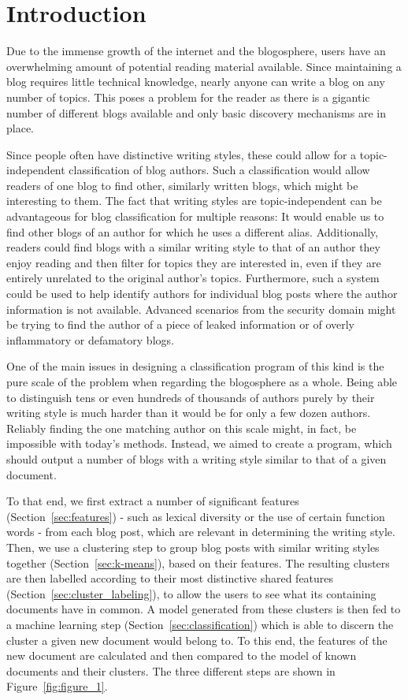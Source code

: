 
\section{Introduction}
\label{sec:introduction}

Due to the immense growth of the internet and the blogosphere, users have an overwhelming amount of potential reading material available.
Since maintaining a blog requires little technical knowledge, nearly anyone can write a blog on any number of topics.
This poses a problem for the reader as there is a gigantic number of different blogs available and only basic discovery mechanisms are in place.


Since people often have distinctive writing styles, these could allow for a topic-independent classification of blog authors.
Such a classification would allow readers of one blog to find other, similarly written blogs, which might be interesting to them.
The fact that writing styles are topic-independent can be advantageous for blog classification for multiple reasons: It would enable us to find other blogs of an author for which he uses a different alias.
Additionally, readers could find blogs with a similar writing style to that of an author they enjoy reading and then filter for topics they are interested in, even if they are entirely unrelated to the original author's topics.
Furthermore, such a system could be used to help identify authors for individual blog posts where the author information is not available.
Advanced scenarios from the security domain might be trying to find the author of a piece of leaked information or of overly inflammatory or defamatory blogs.


One of the main issues in designing a classification program of this kind is the pure scale of the problem when regarding the blogosphere as a whole.
Being able to distinguish tens or even hundreds of thousands of authors purely by their writing style is much harder than it would be for only a few dozen authors.
Reliably finding the one matching author on this scale might, in fact, be impossible with today's methods.
Instead, we aimed to create a program, which should output a number of blogs with a writing style similar to that of a given document.

To that end, we first extract a number of significant features (Section~\ref{sec:features}) - such as lexical diversity or the use of certain function words - from each blog post, which are relevant in determining the writing style.
Then, we use a clustering step to group blog posts with similar writing styles together (Section~\ref{sec:k-means}), based on their features.
The resulting clusters are then labelled according to their most distinctive shared features (Section~\ref{sec:cluster_labeling}), to allow the users to see what its containing documents have in common.
A model generated from these clusters is then fed to a machine learning step (Section~\ref{sec:classification}) which is able to discern the cluster a given new document would belong to.
To this end, the features of the new document are calculated and then compared to the model of known documents and their clusters.
The three different steps are shown in Figure~\ref{fig:figure_1}.

